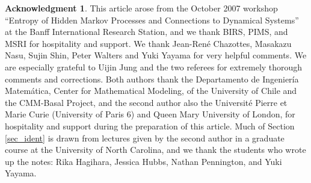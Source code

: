 \documentclass{kepart2010}
\theoremstyle{plain}
\theoremstyle{definition}
\newtheorem*{ack*}{Acknowledgment}
\theoremstyle{remark}
\theoremstyle{definition}
\numberwithin{equation}{section}
\begin{document}
\begin{ack*}
 This article arose from the October 2007 workshop ``Entropy of Hidden
 Markov Processes and Connections to Dynamical Systems''
at the Banff International Research Station, and we thank BIRS,
PIMS, and MSRI for hospitality and support. We thank Jean-Ren\'e
Chazottes, Masakazu Nasu, Sujin Shin, Peter Walters and Yuki Yayama
for very helpful comments. We are especially grateful to Uijin Jung
and the two referees for extremely thorough comments and
corrections.
 Both authors
thank the  Departamento de Ingen{i}er\'{i}a Matem\'{a}tica, Center
for Mathematical Modeling, of the University of Chile and the
CMM-Basal Project, and the second author also the Universit\'e
Pierre et Marie Curie (University of Paris 6) and Queen Mary
University of London, for hospitality and support
 during the preparation of this article.
 Much of Section \ref{sec_ident} is drawn from lectures given
 by the second author in a graduate course at the University of North
 Carolina, and we thank  the students who wrote up the notes:
 Rika Hagihara, Jessica Hubbs, Nathan Pennington, and Yuki Yayama.
\end{ack*}



\end{document}
